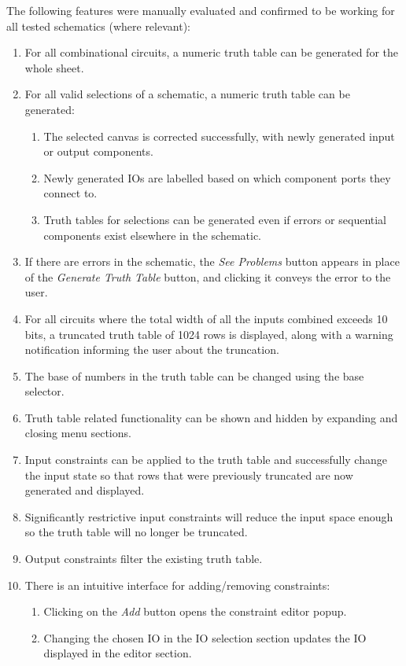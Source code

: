 The following features were manually evaluated and confirmed to be working for all tested schematics (where relevant):
\begin{enumerate}
    \item For all combinational circuits, a numeric truth table can be generated for the whole sheet.
    \item For all valid selections of a schematic, a numeric truth table can be generated:
    \begin{enumerate}
        \item The selected canvas is corrected successfully, with newly generated input or output components.
        \item Newly generated IOs are labelled based on which component ports they connect to.
        \item Truth tables for selections can be generated even if errors or sequential components exist elsewhere in the schematic.
    \end{enumerate}
    \item If there are errors in the schematic, the \textit{See Problems} button appears in place of the \textit{Generate Truth Table} button, and clicking it conveys the error to the user.
    \item For all circuits where the total width of all the inputs combined exceeds 10 bits, a truncated truth table of 1024 rows is displayed, along with a warning notification informing the user about the truncation.
    \item The base of numbers in the truth table can be changed using the base selector.
    \item Truth table related functionality can be shown and hidden by expanding and closing menu sections.
    \item Input constraints can be applied to the truth table and successfully change the input state so that rows that were previously truncated are now generated and displayed.
    \item Significantly restrictive input constraints will reduce the input space enough so the truth table will no longer be truncated.
    \item Output constraints filter the existing truth table.
    \item There is an intuitive interface for adding/removing constraints:
    \begin{enumerate}
        \item Clicking on the \textit{Add} button opens the constraint editor popup.
        \item Changing the chosen IO in the IO selection section updates the IO displayed in the editor section.

\end{enumerate}
\end{enumerate}
